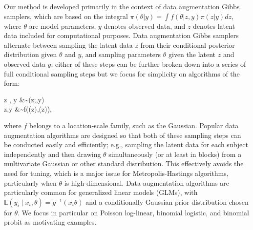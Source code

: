 \documentclass[10pt]{article}
\newcommand{\be}{\begin{equs}}
\newcommand{\ee}{\end{equs}}
\newcommand{\bb}[1]{\mathbb{#1}}
\begin{document}
Our method is developed primarily in the context of data augmentation Gibbs samplers, which are based on the integral $ \pi(\theta|y)=\int f(\theta|z,y) \pi(z|y) dz$, where $\theta$ are model parameters, $y$ denotes observed data, and $z$ denotes latent data included for computational purposes.  Data augmentation Gibbs samplers alternate between sampling the latent data $z$ from their conditional posterior distribution given $\theta$ and $y$, and sampling parameters $\theta$ given the latent $z$ and observed data $y$; either of these steps can be further broken down into a series of full conditional sampling steps but we focus for simplicity on algorithms of the form: 
\be \label{eq:da}
z \mid \theta, y &\sim \pi(z;\theta,y) \\
\theta \mid z,y &\sim f(\mu(z),\Sigma(z)),
\ee
where $f$ belongs to a location-scale family, such as the Gaussian.  Popular data augmentation algorithms are designed so that both of these sampling steps can be conducted easily and efficiently; e.g., sampling the latent data for each subject independently and then drawing $\theta$ simultaneously (or at least in blocks) from a multivariate Gaussian or other standard distribution.  This effectively avoids the need for tuning, which is a major issue for Metropolis-Hastings algorithms, particularly when $\theta$ is high-dimensional.
Data augmentation algorithms are particularly common for generalized linear models (GLMs), with $\bb E(y_i \mid x_i, \theta) = g^{-1}(x_i \theta)$ and a conditionally Gaussian prior distribution chosen for $\theta$. We focus in particular on Poisson log-linear, binomial logistic, and binomial probit as motivating examples.
\end{document}
